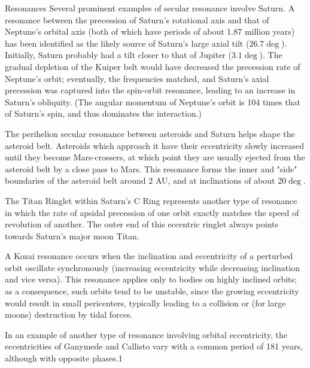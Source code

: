 \begin{frame}[allowframebreaks]{Resonances}
Several prominent examples of secular resonance involve Saturn. A resonance between the precession of Saturn's rotational axis and that of Neptune's orbital axis (both of which have periods of about 1.87 million years) has been identified as the likely source of Saturn's large axial tilt ($26.7\deg$). Initially, Saturn probably had a tilt closer to that of Jupiter ($3.1\deg$). The gradual depletion of the Kuiper belt would have decreased the precession rate of Neptune's orbit; eventually, the frequencies matched, and Saturn's axial precession was captured into the spin-orbit resonance, leading to an increase in Saturn's obliquity. (The angular momentum of Neptune's orbit is 104 times that of Saturn's spin, and thus dominates the interaction.)

The perihelion secular resonance between asteroids and Saturn  helps shape the asteroid belt. Asteroids which approach it have their eccentricity slowly increased until they become Mars-crossers, at which point they are usually ejected from the asteroid belt by a close pass to Mars. This resonance forms the inner and "side" boundaries of the asteroid belt around 2 AU, and at inclinations of about $20\deg$.

The Titan Ringlet within Saturn's C Ring represents another type of resonance in which the rate of apsidal precession of one orbit exactly matches the speed of revolution of another. The outer end of this eccentric ringlet always points towards Saturn's major moon Titan.

A Kozai resonance occurs when the inclination and eccentricity of a perturbed orbit oscillate synchronously (increasing eccentricity while decreasing inclination and vice versa). This resonance applies only to bodies on highly inclined orbits; as a consequence, such orbits tend to be unstable, since the growing eccentricity would result in small pericenters, typically leading to a collision or (for large moons) destruction by tidal forces.

In an example of another type of resonance involving orbital eccentricity, the eccentricities of Ganymede and Callisto vary with a common period of 181 years, although with opposite phases.1

\end{frame}

